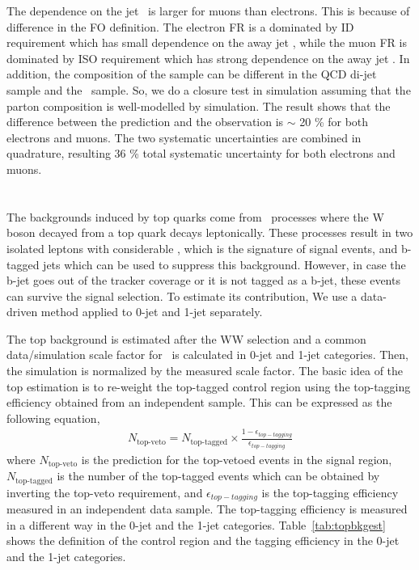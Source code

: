 The dependence on the jet \pt\ is larger for muons than electrons. 
This is because of difference in the FO definition. The electron FR is a
dominated by ID requirement which has small dependence on the away jet \pt, 
while the muon FR is dominated by ISO requirement which has strong dependence 
on the away jet \pt.
In addition, the composition of the sample can be different in the QCD di-jet sample 
and the \Wjets\ sample. So, we do a closure test in simulation 
assuming that the parton composition is well-modelled by simulation. 
The result shows that the difference between 
the prediction and the observation is $\sim$ 20 \% for both electrons and muons.
The two systematic uncertainties are combined in quadrature, resulting 
36 \% total systematic uncertainty for both electrons and muons. 
\section{ \topbkg }

The backgrounds induced by top quarks come from \topbkg\ processes where 
the W boson decayed from a top quark decays leptonically. These processes 
result in two isolated leptons with considerable \met, which is 
the signature of signal events, and b-tagged jets which
can be used to suppress this background. However, in case the b-jet 
goes out of the tracker coverage or it is not tagged as a b-jet, 
these events can survive the signal selection. To estimate its 
contribution, We use a data-driven method applied to 0-jet and 1-jet separately.

The top background is estimated after the WW selection and a common 
data/simulation scale factor for \topbkg\ is calculated in 0-jet and 1-jet 
categories. Then, the simulation is normalized by the measured scale factor. 
The basic idea of the top estimation is to re-weight the top-tagged control region 
using the top-tagging efficiency obtained from an independent sample. This 
can be expressed as the following equation, 
\begin{eqnarray} 
N_\textrm{top-veto} 
= 
N_{\textrm{top-tagged}} \times
\frac{1 - \epsilon_{top-tagging}}{\epsilon_{top-tagging}}   
\end{eqnarray} 
where $N_\textrm{top-veto}$ is the prediction for the top-vetoed events 
in the signal region, $N_{\textrm{top-tagged}}$ is the number of 
the top-tagged events which can be obtained by inverting the top-veto requirement, 
and $\epsilon_{top-tagging}$ is the top-tagging efficiency 
measured in an independent data sample. The top-tagging efficiency 
is measured in a different way in the 0-jet and the 1-jet categories.
Table~\ref{tab:topbkgest} shows the definition of the control region 
and the tagging efficiency in the 0-jet and the 1-jet categories.

